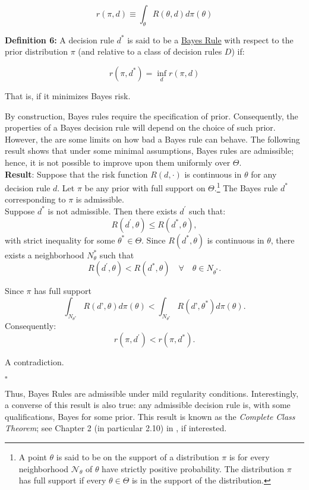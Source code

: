 \documentclass[11pt]{article} %
\begin{document}
\[ r(\pi, d) \equiv \int_{\theta} R(\theta, d) d \pi (\theta) \]

\noindent \textbf{Definition 6:} A decision rule $d^*$ is said to be a \underline{Bayes Rule} with respect to the prior distribution $\pi$ (and relative to a class of decision rules $D$) if:

\[ r(\pi, d^*) = \inf_{d} r(\pi, d)   \]

\noindent That is, if it minimizes Bayes risk. 

By construction, Bayes rules require the specification of prior. Consequently, the properties of a Bayes decision rule will depend on the choice of such prior. However, the are some limits on how bad a Bayes rule can behave. The following result shows that under some minimal assumptions, Bayes rules are admissible; hence, it is not possible to improve upon them uniformly over $\Theta$. \\


\noindent \textbf{Result}: Suppose that the risk function $R(d, \cdot)$ is continuous in $\theta$ for any decision rule $d$. Let $\pi$ be any prior with full support on $\Theta$.\footnote{A point $\theta$ is said to be on the support of a distribution $\pi$ is for every neighborhood $\mathcal{N}_{\theta}$ of $\theta$ have strictly positive probability. The distribution $\pi$ has full support if every $\theta \in \Theta$ is in the support of the distribution.} The Bayes rule $d^*$ corresponding to $\pi$ is admissible. \\

 Suppose $d^*$ is not admissible. Then there exists $d^{\prime}$ such that:
\[ R(d^{\prime}, \theta) \leq R(d^*, \theta),  \]
with strict inequality for some $\theta^* \in \Theta$. Since $R(d^*,\theta)$ is continuous in $\theta$, there exists a neighborhood $N_\theta^*$ such that 
\[  R(d^{\prime}, \theta) < R(d^*, \theta) \quad \forall \quad \theta \in N_{\theta^*}. \]

\noindent Since $\pi$ has full support 
\[ \int_{N_{\theta^*}} R(d’,\theta) d \pi(\theta) < \int_{N_{\theta^*}} R(d’,\theta^*) d \pi(\theta).   \]
Consequently:
\[ r(\pi, d^{\prime}) < r(\pi, d^*).   \]

\noindent A contradiction. \\

\begin{flushright}
$\square$
\end{flushright}

\noindent Thus, Bayes Rules are admissible under mild regularity conditions. Interestingly, a converse of this result is also true: any admissible decision rule is, with some qualifications,	 Bayes for some prior. This result is known as the \emph{Complete Class Theorem}; see Chapter 2 (in particular 2.10) in \cite{Ferguson67}, if interested.  
\end{document}
